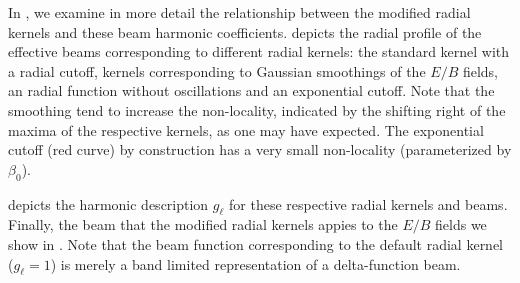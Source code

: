 In , we examine in more detail the relationship between the modified radial kernels and these beam harmonic coefficients.  
  depicts the radial profile of the  effective beams corresponding to different radial kernels: the standard kernel with a radial cutoff, kernels corresponding to Gaussian smoothings of the $E/B$ fields, an radial function without oscillations and an exponential cutoff.  Note that the smoothing tend to increase the non-locality, indicated by the shifting right of the maxima of the respective kernels, as one may have expected.  The exponential cutoff (red curve) by construction has a very small non-locality (parameterized by $\beta_0$).

 depicts the harmonic description $g_{\ell}$ for these respective radial kernels and beams.
Finally, the beam that the modified radial kernels appies to the $E/B$ fields we show in .  Note that the beam function corresponding to the default radial kernel ($g_{\ell}=1$) is merely a band limited representation of a delta-function beam.

